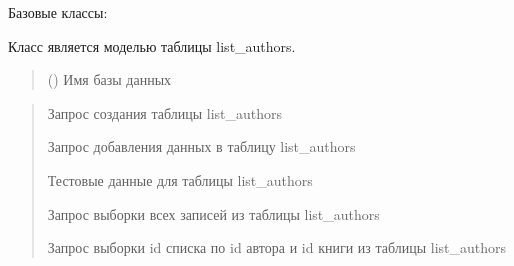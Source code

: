 \documentclass[letterpaper,10pt,russian]{sphinxmanual}
\begin{document}
\begin{fulllineitems}
\label{\detokenize{database.sqlite3_interface.tables:database.sqlite3_interface.tables.list_authors.ListAuthors}}
\pysigstartsignatures
{}
\pysigstopsignatures
\sphinxAtStartPar
Базовые классы: {\hyperref[\detokenize{database.sqlite3_interface.tables:database.sqlite3_interface.tables.table.Table}]{}}

\sphinxAtStartPar
Класс является моделью таблицы list\_authors.
\begin{quote}\begin{description}
\sphinxAtStartPar
{} () \textendash{} Имя базы данных

\end{description}\end{quote}
\begin{description}
\begin{quote}\begin{description}
\sphinxAtStartPar
Запрос создания таблицы list\_authors

\sphinxAtStartPar
Запрос добавления данных в таблицу list\_authors

\sphinxAtStartPar
Тестовые данные для таблицы list\_authors

\sphinxAtStartPar
Запрос выборки всех записей из таблицы list\_authors

\sphinxAtStartPar
Запрос выборки id списка по id автора и id книги из таблицы list\_authors

\end{description}\end{quote}


\end{description}
\end{fulllineitems}
\end{document}
